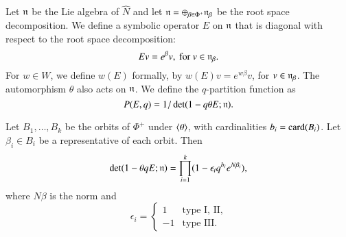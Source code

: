 Let ${\mathfrak n}$ be the Lie algebra of $\hat N$ and
let ${\mathfrak n} = \oplus_{\beta\in \Phi^+} {\mathfrak n}_\beta$ be the root space decomposition.  We define a symbolic operator $E$ on ${\mathfrak n}$ that is diagonal with
respect to the root space decomposition:
\[
E v = e^{\beta} v, \text{ for } v \in {\mathfrak n}_\beta.
\]
For $w\in W$, we define $w(E)$ formally, by $w(E) v = e^{ w \beta} v$, for $v\in {\mathfrak n}_\beta$.
The automorphism $\theta$ also acts on ${\mathfrak n}$.  We define the $q$-partition function as
\[
P(E,q) = 1/\det(1- q \theta E;{\mathfrak n}).
\]

\begin{lemma} \label{eqn:weyl-product}
Let $B_1,\ldots,B_k$ be the orbits of $\Phi^+$ under $\langle{\theta}\rangle$, with cardinalities $b_i = {\operatorname{card}}(B_i)$.
Let $\beta_i\in B_i$ be a representative of each orbit.
Then
\[
\det(1-\theta  q E;{\mathfrak n}) = \prod_{i=1}^k (1- \epsilon_i q^{b_i} e^{N\beta_i}),
\]
where 
$N\beta$ is the norm and
\[
\epsilon_i=\begin{cases} 1 & \text{type I, II},\\
     -1 & \text{type III}.
\end{cases}
\]
\end{lemma}


